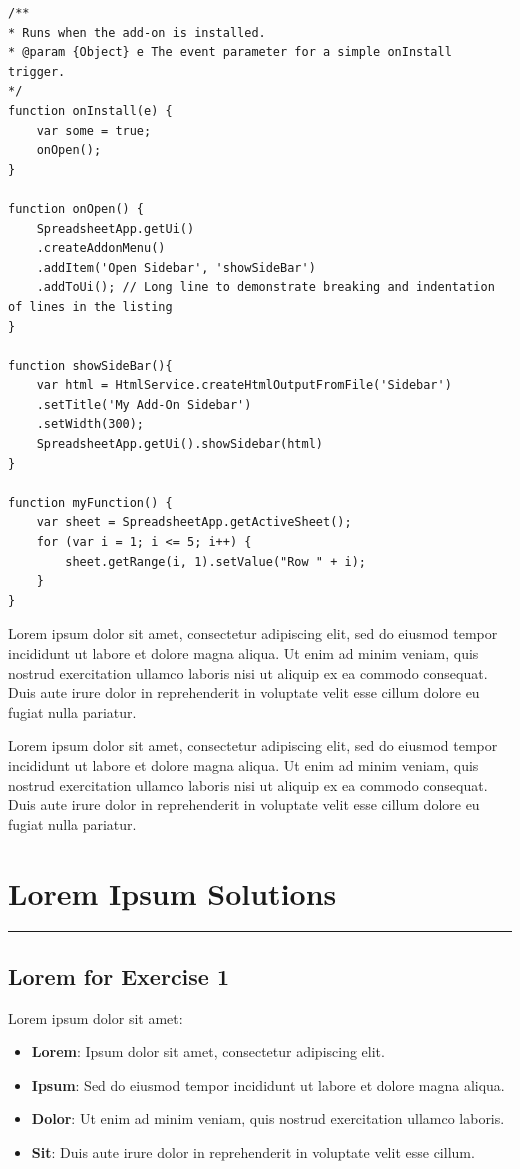 \begin{lstlisting}[caption={Descriptive Caption Text},label=DescriptiveLabel]
/**
* Runs when the add-on is installed.
* @param {Object} e The event parameter for a simple onInstall trigger.
*/
function onInstall(e) {
	var some = true;
	onOpen();
}

function onOpen() {
	SpreadsheetApp.getUi()
	.createAddonMenu()
	.addItem('Open Sidebar', 'showSideBar')
	.addToUi(); // Long line to demonstrate breaking and indentation of lines in the listing
}

function showSideBar(){
	var html = HtmlService.createHtmlOutputFromFile('Sidebar')
	.setTitle('My Add-On Sidebar')
	.setWidth(300);
	SpreadsheetApp.getUi().showSidebar(html)
}

function myFunction() {
	var sheet = SpreadsheetApp.getActiveSheet();
	for (var i = 1; i <= 5; i++) {
		sheet.getRange(i, 1).setValue("Row " + i);
	}
}
\end{lstlisting}
Lorem ipsum dolor sit amet, consectetur adipiscing elit, sed do eiusmod tempor incididunt ut labore et dolore magna aliqua. Ut enim ad minim veniam, quis nostrud exercitation ullamco laboris nisi ut aliquip ex ea commodo consequat. Duis aute irure dolor in reprehenderit in voluptate velit esse cillum dolore eu fugiat nulla pariatur.

Lorem ipsum dolor sit amet, consectetur adipiscing elit, sed do eiusmod tempor incididunt ut labore et dolore magna aliqua. Ut enim ad minim veniam, quis nostrud exercitation ullamco laboris nisi ut aliquip ex ea commodo consequat. Duis aute irure dolor in reprehenderit in voluptate velit esse cillum dolore eu fugiat nulla pariatur.

\pagebreak
\pagecolor{lightyellow}
\section*{Lorem Ipsum Solutions}
\hrule
\subsection*{Lorem for Exercise 1}
Lorem ipsum dolor sit amet:
\begin{itemize}[noitemsep, topsep=0pt]
	\item \textbf{Lorem}: Ipsum dolor sit amet, consectetur adipiscing elit.
	\item \textbf{Ipsum}: Sed do eiusmod tempor incididunt ut labore et dolore magna aliqua.
	\item \textbf{Dolor}: Ut enim ad minim veniam, quis nostrud exercitation ullamco laboris.
	\item \textbf{Sit}: Duis aute irure dolor in reprehenderit in voluptate velit esse cillum.
\end{itemize}

